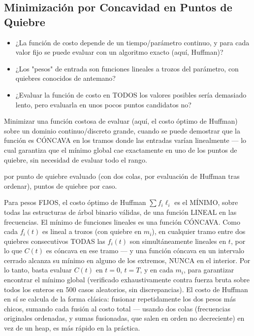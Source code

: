 \subsection{Minimización por Concavidad en Puntos de Quiebre}


\begin{itemize}
\item ¿La función de costo depende de un tiempo/parámetro continuo, y para cada valor fijo se puede evaluar con un algoritmo exacto (aquí, Huffman)?
\item ¿Los "pesos" de entrada son funciones lineales a trozos del parámetro, con quiebres conocidos de antemano?
\item ¿Evaluar la función de costo en TODOS los valores posibles sería demasiado lento, pero evaluarla en unos pocos puntos candidatos no?
\end{itemize}

 Minimizar una función costosa de evaluar (aquí, el costo óptimo de Huffman) sobre un dominio continuo/discreto grande, cuando se puede demostrar que la función es CÓNCAVA en los tramos donde las entradas varían linealmente — lo cual garantiza que el mínimo global cae exactamente en uno de los puntos de quiebre, sin necesidad de evaluar todo el rango.

  por punto de quiebre evaluado (con dos colas,  por evaluación de Huffman tras ordenar),  puntos de quiebre por caso.

 Para pesos FIJOS, el costo óptimo de Huffman $\sum f_i \ell_i$ es el MÍNIMO, sobre todas las estructuras de árbol binario válidas, de una función LINEAL en las frecuencias. El mínimo de funciones lineales es una función CÓNCAVA. Como cada $f_i(t)$ es lineal a trozos (con quiebre en $m_i$), en cualquier tramo entre dos quiebres consecutivos TODAS las $f_i(t)$ son simultáneamente lineales en $t$, por lo que $C(t)$ es cóncava en ese tramo — y una función cóncava en un intervalo cerrado alcanza su mínimo en alguno de los extremos, NUNCA en el interior. Por lo tanto, basta evaluar $C(t)$ en $t=0$, $t=T$, y en cada $m_i$, para garantizar encontrar el mínimo global (verificado exhaustivamente contra fuerza bruta sobre todos los enteros en 500 casos aleatorios, sin discrepancias). El costo de Huffman en sí se calcula de la forma clásica: fusionar repetidamente los dos pesos más chicos, sumando cada fusión al costo total — usando dos colas (frecuencias originales ordenadas, y sumas fusionadas, que salen en orden no decreciente) en vez de un heap, es más rápido en la práctica.

